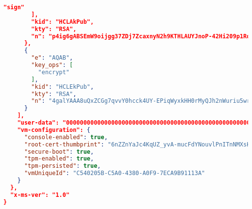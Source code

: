 \begin{lstlisting}[language=json]
          "sign"
        ],
        "kid": "HCLAkPub",
        "kty": "RSA",
        "n": "p4ig6gABSEmW9oijgg37ZDj7ZcaxnyN2h9KTHLAUYJnoP-42Hi209p1RdiL3HSWdRzzSDuXKjQw2kzlmcX1XfBq9-3-L-CVoyCvpiin-6k9L_Rbu0upEiBnIw2IzJ5N6EZx7zfX8vdh76MMnT-_U2Pd2psoiUufzNvs2-5d0QB5NyTuCnXbWD_yWb1OQWZAPioXEIyR13ic-FxPt5UiGG6kBjGp41rqlEQ0B_tsfn3e19_lTx76wVfEkEOw5Yq60rTyNuxiOnR59reaxXui0qJTOkoiDOJ-tHLffY_jTT-8EUFtWS1mcPoye2uKRhAI99xjTWg88Ft4sIUv8stOTvw"
      },
      {
        "e": "AQAB",
        "key_ops": [
          "encrypt"
        ],
        "kid": "HCLEkPub",
        "kty": "RSA",
        "n": "4galYAAA8uQxZCGg7qvvY0hcck4UY-EPiqWyxkHH0rMyQJh2nWuriu5wrh4JPPy6HvtX5M-mr5ecHPYf4S0qTOcqWZX01Uj8Ky1sbvA6g1GELe0Jdqf9piQDmS90dGwR6PItHMObnejzBocweHxkuSm7pGSuOAniX6KDid1hsxED5gYLxg2wHAXFICz9UZOTQ6FZmezVz0Krpr2AF4fKawOIaQSwNl7GIjH09x7rFRP2H1zOW6sJYAIAIT7F7vfncB3ZpPHUrU9U-qSQC2LZBRtjuBaKG-kGU6jAOkMC8aXu_pb99vgrrJpn2Nf8VodePJ7gzwladZjCnflyUWViYw"
      }
    ],
    "user-data": "00000000000000000000000000000000000000000000000000000000000000000000000000000000000000000000000000000000000000000000000000000000",
    "vm-configuration": {
      "console-enabled": true,
      "root-cert-thumbprint": "6nZZnYaJc4KqUZ_yvA-mucFdYNouvlPnITnNMXsHl-0",
      "secure-boot": true,
      "tpm-enabled": true,
      "tpm-persisted": true,
      "vmUniqueId": "C540205B-C5A0-4380-A0F9-7ECA9B91113A"
    }
  },
  "x-ms-ver": "1.0"
}
\end{lstlisting}
